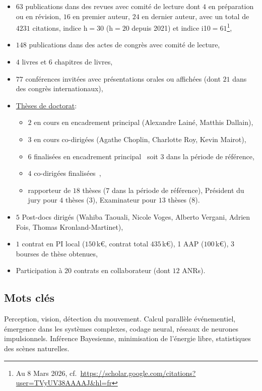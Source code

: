 \documentclass[10pt,french,a4paper]{article}%
\begin{document}
\begin{itemize}
	
	\item	$63$ publications dans des revues avec comité de lecture dont $4$ en préparation ou en révision, $16$ en premier auteur, $24$ en dernier auteur, avec un total de $4231$ citations, indice h$=30$ (h$=20$ depuis 2021) et indice i10$=61$\footnote{Au 8 Mars 2026, cf.~\url{https://scholar.google.com/citations?user=TVyUV38AAAAJ&hl=fr}},
	\item	$148$ publications dans des actes de congrès avec comité de lecture,
	\item	$4$ livres et $6$ chapitres de livres,
	\item	$77$ conférences invitées avec présentations orales
	ou affichées (dont $21$ dans des congrès internationaux),
	\item \href{https://www.theses.fr/074493701}{Thèses de doctorat}:
	\begin{itemize}
		\item $2$ en cours en encadrement principal (Alexandre Lainé, Matthis Dallain),
		\item $3$ en cours co-dirigées (Agathe Choplin, Charlotte Roy, Kevin Mairot),
		\item $6$ finalisées en encadrement principal~\citep{Khoei14thesis,Boutin20thesis,Franciosini21thesis,Ladret24thesis,Grimaldi24thesis,Jeremie25thesis} soit $3$ dans la période de référence,
		\item $4$ co-dirigées finalisées~\citep{Kremkow09thesis,Damasse18thesis,MansourPour19thesis,Gruel23thesis},
		\item rapporteur de $18$ thèses ($7$ dans la période de référence), Président du jury pour $4$ thèses ($3$), Examinateur pour $13$ thèses ($8$).
	\end{itemize} %
	\item $5$ Post-docs dirigés (Wahiba Taouali, Nicole Voges, Alberto Vergani, Adrien Fois, Thomas Kronland-Martinet),
	\item $1$ contrat en PI local ($150$\,k€, contrat total $435$\,k€), 1 AAP ($100$\,k€), $3$ bourses de thèse obtenues,
	\item Participation à $20$ contrats en collaborateur (dont $12$ ANRs).
	
	
\end{itemize} %

\subsection*{Mots clés}
Perception, vision, détection du mouvement. Calcul parallèle événementiel, émergence dans les systèmes complexes, codage neural, réseaux de neurones impulsionnels. Inférence Bayesienne, minimisation de l'énergie libre, statistiques des scènes naturelles.
\end{document}
